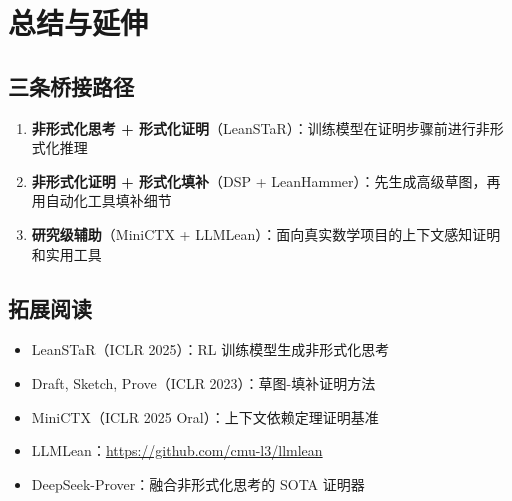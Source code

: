 \section{总结与延伸}

\subsection{三条桥接路径}

\begin{enumerate}
    \item \textbf{非形式化思考 + 形式化证明}（LeanSTaR）：训练模型在证明步骤前进行非形式化推理
    \item \textbf{非形式化证明 + 形式化填补}（DSP + LeanHammer）：先生成高级草图，再用自动化工具填补细节
    \item \textbf{研究级辅助}（MiniCTX + LLMLean）：面向真实数学项目的上下文感知证明和实用工具
\end{enumerate}

\subsection{拓展阅读}
\begin{itemize}
    \item LeanSTaR（ICLR 2025）：RL 训练模型生成非形式化思考
    \item Draft, Sketch, Prove（ICLR 2023）：草图-填补证明方法
    \item MiniCTX（ICLR 2025 Oral）：上下文依赖定理证明基准
    \item LLMLean：\url{https://github.com/cmu-l3/llmlean}
    \item DeepSeek-Prover：融合非形式化思考的 SOTA 证明器
\end{itemize}


